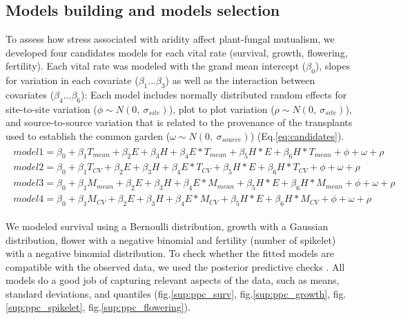 \documentclass[12pt]{article}\usepackage[]{graphicx}\usepackage[dvipsnames]{xcolor}
\begin{document}
\subsection*{Models building and models selection}
To assess how stress associated with aridity  affect plant-fungal mutualism, we developed four candidates models for each vital rate (survival, growth, flowering, fertility). 
Each vital rate was modeled with  the  grand mean intercept ($\beta_{0}$), slopes for  variation in each covariate ($\beta_{1}$...$\beta_{3}$) as well as the interaction between covariates ($\beta_{4}$...$\beta_{6}$): 
Each model includes normally distributed random effects for site-to-site  variation ($\phi \sim N(0,\ \sigma_{site})$), plot to plot variation ($\rho \sim N(0,\ \sigma_{site})$), and source-to-source variation that is related to the  provenance of the transplants used to establish the common garden ($\omega \sim N(0,\ \sigma_{source})$) (Eq.\ref{eq:candidates}).
\begin{align}\label{eq:candidates}
\begin{split}
model1 = \beta_{0} + \beta_{1}T_{mean}  + \beta_{2}E + \beta_{3}H + \beta_{4}E*T_{mean} + \beta_{5}H*E +  \beta_{6}H*T_{mean} + \phi + \omega + \rho  \\ 
model2  = \beta_{0} + \beta_{1}T_{CV}  + \beta_{2}E + \beta_{3}H + \beta_{4}E*T_{CV} + \beta_{5}H*E +  \beta_{6}H*T_{CV} +  \phi + \omega + \rho  \\
model3  = \beta_{0} + \beta_{1}M_{mean}  + \beta_{2}E + \beta_{3}H + \beta_{4}E*M_{mean} + \beta_{5}H*E +  \beta_{6}H*M_{mean} + \phi + \omega + \rho \\
model4  = \beta_{0} + \beta_{1}M_{CV}  + \beta_{2}E + \beta_{3}H + \beta_{4}E*M_{CV} + \beta_{5}H*E +  \beta_{6}H*M_{CV} + \phi + \omega + \rho 
\end{split}
\end{align}
 
We modeled survival using a  Bernoulli distribution, growth with a Gaussian distribution, flower with a negative binomial and fertility (number of spikelet) with a negative binomial distribution.
To check whether the fitted models are  compatible with the observed data, we used the posterior predictive checks \citep{gelman2000diagnostic,berkhof2000posterior}. 
All models  do a good job of capturing relevant aspects of the data, such as means, standard deviations, and quantiles (fig.\ref{sup:ppc_surv}, fig.\ref{sup:ppc_growth}, fig.\ref{sup:ppc_spikelet}, fig.\ref{sup:ppc_flowering}).
\end{document}
